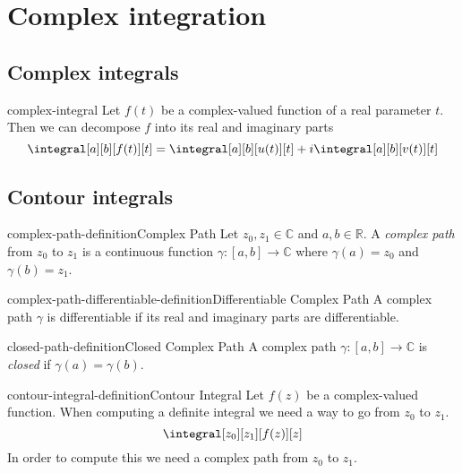 \documentclass[preview]{standalone}
\begin{document}
\genpage

\section{Complex integration}

\subsection{Complex integrals}

\begin{snippet}{complex-integral}
Let \(f(t)\) be a complex-valued function of a real parameter \(t\). Then
we can decompose \(f\) into its real and imaginary parts
\[
    \integral[a][b][f(t)][t]=\integral[a][b][u(t)][t]+i\integral[a][b][v(t)][t]
\]
\end{snippet}

\subsection{Contour integrals}

\begin{snippetdefinition}{complex-path-definition}{Complex Path}
    Let \(z_0, z_1 \in \mathbb{C}\) and \(a,b\in \mathbb{R}\).
    A \textit{complex path} from \(z_0\) to \(z_1\) is a continuous function
    \(\gamma\colon [a,b] \to \mathbb{C}\) where \(\gamma(a)=z_0\) and \(\gamma(b)=z_1\).
\end{snippetdefinition}

\begin{snippetdefinition}{complex-path-differentiable-definition}{Differentiable Complex Path}
    A complex path \(\gamma\) is differentiable if its real and imaginary parts are differentiable.
\end{snippetdefinition}

\begin{snippetdefinition}{closed-path-definition}{Closed Complex Path}
    A complex path \(\gamma\colon [a,b] \to \mathbb{C}\)
    is \textit{closed} if \(\gamma(a)=\gamma(b)\).
\end{snippetdefinition}

\begin{snippetdefinition}{contour-integral-definition}{Contour Integral}
    Let \(f(z)\) be a complex-valued function.
    When computing a definite integral we need a way to go from \(z_0\) to \(z_1\).
    \[
        \integral[z_0][z_1][f(z)][z]
    \]
    In order to compute this we need a complex path from \(z_0\) to \(z_1\).
\end{snippetdefinition}
\end{document}
